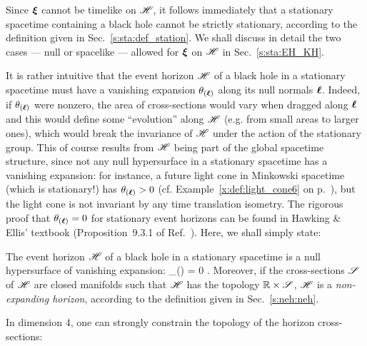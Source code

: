 Since $\bm{\xi}$ cannot be timelike on $\mathscr{H}$, it follows immediately
that a stationary spacetime containing a black hole cannot be strictly stationary,
according to the definition given in Sec.~\ref{s:sta:def_station}.
We shall discuss in detail the two cases --- null or spacelike --- allowed
for $\bm{\xi}$ on $\mathscr{H}$ in Sec.~\ref{s:sta:EH_KH}.

It is rather intuitive that the event horizon $\mathscr{H}$ of a black hole in
a stationary spacetime must have a vanishing expansion $\theta_{(\bm{\ell})}$ along its null
normals $\bm{\ell}$. Indeed, if $\theta_{(\bm{\ell})}$ were nonzero,
the area of cross-sections would vary when dragged
along $\bm{\ell}$ and this would define some ``evolution'' along $\mathscr{H}$ (e.g. from small areas
to larger ones),
which would break the invariance of $\mathscr{H}$ under the action of the stationary group.
This of course results from $\mathscr{H}$ being part of the global spacetime structure,
since not any null hypersurface in a stationary spacetime has a vanishing
expansion: for instance, a future light cone in Minkowski spacetime
(which is stationary!) has $\theta_{(\bm{\ell})}>0$
(cf. Example~\ref{x:def:light_cone6} on p.~\pageref{x:def:light_cone6}),
but the light cone is not invariant by any time translation isometry.
The rigorous proof that $\theta_{(\bm{\ell})} = 0$
for stationary event horizons can be found in Hawking \& Ellis' textbook
(Proposition~9.3.1 of Ref.~\cite{HawkiE73}).
Here, we shall simply state:
\begin{prop}
\label{p:sta:hor_non_expanding}
The event horizon $\mathscr{H}$ of a black hole in a stationary spacetime
is a null hypersurface of vanishing expansion:
\be
    \theta_{(\wl)} = 0 .
\ee
Moreover, if the cross-sections $\mathscr{S}$ of $\mathscr{H}$
are closed manifolds such that $\mathscr{H}$ has the topology $\mathbb{R}\times \mathscr{S}$, $\mathscr{H}$ is a
\emph{non-expanding horizon},
according to the definition given in Sec.~\ref{s:neh:neh}.
\end{prop}

In dimension 4, one can strongly constrain the topology of the horizon cross-sections:

